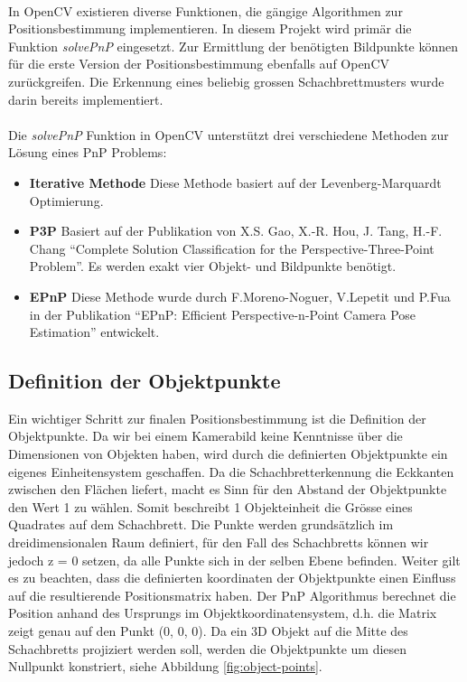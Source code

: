 \paragraph{}
In OpenCV existieren diverse Funktionen, die gängige Algorithmen zur Positionsbestimmung implementieren. In diesem Projekt wird primär die Funktion \textit{solvePnP} eingesetzt. Zur Ermittlung der benötigten Bildpunkte können für die erste Version der Positionsbestimmung ebenfalls auf OpenCV zurückgreifen. Die Erkennung eines beliebig grossen Schachbrettmusters wurde darin bereits implementiert. 

\paragraph{}
Die \textit{solvePnP} Funktion in OpenCV unterstützt drei verschiedene Methoden zur Lösung eines PnP Problems:

\begin{itemize}

\item \textbf{Iterative Methode}
Diese Methode basiert auf der Levenberg-Marquardt Optimierung.

\item \textbf{P3P}
Basiert auf der Publikation von X.S. Gao, X.-R. Hou, J. Tang, H.-F. Chang ``Complete Solution Classification for the Perspective-Three-Point Problem''. Es werden exakt vier Objekt- und Bildpunkte benötigt.

\item \textbf{EPnP}
Diese Methode wurde durch F.Moreno-Noguer, V.Lepetit und P.Fua in der Publikation ``EPnP: Efficient Perspective-n-Point Camera Pose Estimation'' entwickelt.

\end{itemize}


\subsection{Definition der Objektpunkte}
\label{sec:definition-objektpunkte}

Ein wichtiger Schritt zur finalen Positionsbestimmung ist die Definition der Objektpunkte. Da wir bei einem Kamerabild keine Kenntnisse über die Dimensionen von Objekten haben, wird durch die definierten Objektpunkte ein eigenes Einheitensystem geschaffen. Da die Schachbretterkennung die Eckkanten zwischen den Flächen liefert, macht es Sinn für den Abstand der Objektpunkte den Wert 1 zu wählen. Somit beschreibt 1 Objekteinheit die Grösse eines Quadrates auf dem Schachbrett. Die Punkte werden grundsätzlich im dreidimensionalen Raum definiert, für den Fall des Schachbretts können wir jedoch z = 0 setzen, da alle Punkte sich in der selben Ebene befinden.
\noindent
Weiter gilt es zu beachten, dass die definierten koordinaten der Objektpunkte einen Einfluss auf die resultierende Positionsmatrix haben. Der PnP Algorithmus berechnet die Position anhand des Ursprungs im Objektkoordinatensystem, d.h. die Matrix zeigt genau auf den Punkt (0, 0, 0). 
Da ein 3D Objekt auf die Mitte des Schachbretts projiziert werden soll, werden die Objektpunkte um diesen Nullpunkt konstriert, siehe Abbildung \ref{fig:object-points}.

